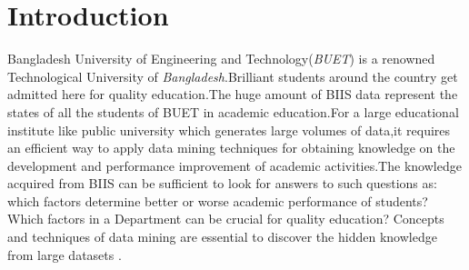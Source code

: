 
\chapter{Introduction} %

\label{Introduction} %


\newcommand{\keyword}[1]{\textbf{#1}}
\newcommand{\tabhead}[1]{\textbf{#1}}
\newcommand{\code}[1]{\texttt{#1}}
\newcommand{\file}[1]{\texttt{\bfseries#1}}
\newcommand{\option}[1]{\texttt{\itshape#1}}


Bangladesh University of Engineering and Technology(\textit{BUET}) is a renowned Technological University of \textit{Bangladesh}.Brilliant students around the country get admitted here for quality education.The huge amount of BIIS data represent the states of all the students of BUET in academic education.For a large educational institute like public university which generates large volumes of data,it requires an efficient way to apply data mining techniques for obtaining knowledge on the development and performance improvement of academic activities.The knowledge acquired from BIIS can be sufficient to look for answers to such questions as: which factors determine better or worse academic performance of students? Which factors in a Department can be crucial for quality education? Concepts and techniques of data mining are essential to discover the hidden knowledge from large datasets \cite{concepts} .

